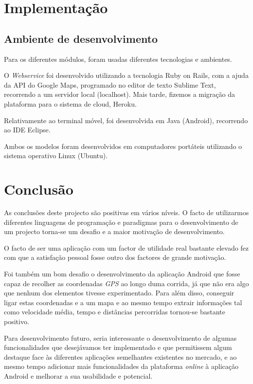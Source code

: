 \documentclass[15pt,a4paper]{article}
\begin{document}
\section{Implementação}

\subsection{Ambiente de desenvolvimento}

Para os diferentes módulos, foram usadas diferentes tecnologias e ambientes.

O \textit{Webservice} foi desenvolvido utilizando a tecnologia Ruby on Rails, com a ajuda da API do Google Maps, programado no editor de texto Sublime Text, recorrendo a um servidor local (localhost). Mais tarde, fizemos a migração da plataforma para o sistema de cloud, Heroku.

Relativamente ao terminal móvel, foi desenvolvida em Java (Android), recorrendo ao IDE Eclipse. 

Ambos os modelos foram desenvolvidos em computadores portáteis utilizando o sistema operativo Linux (Ubuntu).


\newpage
\section{Conclusão}

As conclusões deste projecto são positivas em vários níveis. O facto de utilizarmos diferentes linguagens de programação e paradigmas para o desenvolvimento de um projecto torna-se um desafio e a maior motivação de desenvolvimento. 

O facto de ser uma aplicação com um factor de utilidade real bastante elevado fez com que a satisfação pessoal fosse outro dos factores de grande motivação.

Foi também um bom desafio o desenvolvimento da aplicação Android que fosse capaz de recolher as coordenadas \textit{GPS} ao longo duma corrida, já que não era algo que nenhum dos elementos tivesse experimentado. Para além disso, conseguir ligar estas coordenadas e a um mapa e ao mesmo tempo extrair informações tal como velocidade média, tempo e distâncias percorridas tornou-se bastante positivo.

Para desenvolvimento futuro, seria interessante o desenvolvimento de algumas funcionalidades que desejávamos ter implementado e que permitissem algum destaque face às diferentes aplicações semelhantes existentes no mercado, e ao mesmo tempo adicionar mais funcionalidades da plataforma \textit{online} à aplicação Android e melhorar a sua usabilidade e potencial.
\end{document}
